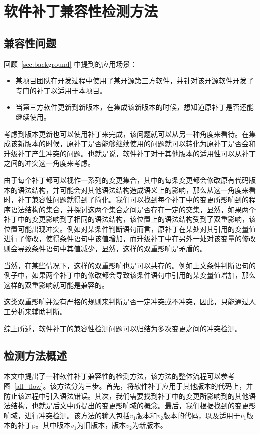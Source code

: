 \chapter{软件补丁兼容性检测方法}

\section{兼容性问题}
\label {sec_problem}

回顾~\ref{sec:background} 中提到的应用场景：
\begin{itemize}
	\item 某项目团队在开发过程中使用了某开源第三方软件，并针对该开源软件开发了专门的补丁以适用于本项目。
	\item 当第三方软件更新到新版本，在集成该新版本的时候，想知道原补丁是否还能继续使用。
\end{itemize}

考虑到版本更新也可以使用补丁来完成，该问题就可以从另一种角度来看待。在集成该新版本的时候，原补丁是否能够继续使用的问题就可以转化为原补丁是否会和升级补丁产生冲突的问题。也就是说，软件补丁对于其他版本的适用性可以从补丁之间的冲突这一角度来考虑。

由于每个补丁都可以视作一系列的变更集合，其中的每条变更都会修改原有代码版本的语法结构，并可能会对其他语法结构造成语义上的影响，那么从这一角度来看时，补丁兼容性问题就得到了简化。我们可以找到每个补丁中的变更所影响到的程序语法结构的集合，并探讨这两个集合之间是否存在一定的交集，显然，如果两个补丁中的变更影响到了相同的语法结构，该位置上的语法结构受到了双重影响，该位置可能出现冲突。例如对某条件判断语句而言，原补丁在某处对其引用的变量值进行了修改，使得条件语句中该值增加，而升级补丁中在另外一处对该变量的修改则会导致条件语句中其值减少，显然，这样的双重影响是矛盾的。

当然，在某些情况下，这样的双重影响也是可以共存的。例如上文条件判断语句的例子中，如果两个补丁中的修改都会导致该条件语句中引用的某变量值增加，那么这样的双重影响就可能是兼容的。

这类双重影响并没有严格的规则来判断是否一定冲突或不冲突，因此，只能通过人工分析来辅助判断。

综上所述，软件补丁的兼容性检测问题可以归结为多次变更之间的冲突检测。

\section{检测方法概述}
\label {sec_method}

本文中提出了一种软件补丁兼容性的检测方法，该方法的整体流程可以参考图~\ref{all_flow}。该方法分为三步。首先，将软件补丁应用于其他版本的代码上，并防止该过程中引入语法错误。其次，我们需要找到补丁中的变更所影响到的其他语法结构，也就是后文中所提出的变更影响域的概念。最后，我们根据找到的变更影响域，进行冲突检测。该方法的输入包括$v_1$版本和$v_2$版本的代码，以及适用于$v_1$版本的补丁p。其中版本$v_1$为旧版本，版本$v_2$为新版本。

